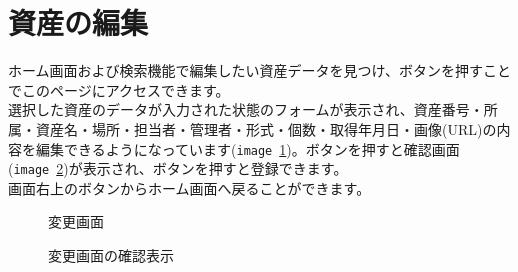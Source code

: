 \documentclass[11ptm]{jsarticle}
\begin{document}
\clearpage
\section{資産の編集}
\label{sec:資産の編集}
ホーム画面および検索機能で編集したい資産データを見つけ、ボタンを押すことでこのページにアクセスできます。\\
選択した資産のデータが入力された状態のフォームが表示され、資産番号・所属・資産名・場所・担当者・管理者・形式・個数・取得年月日・画像(URL)の内容を編集できるようになっています({\tt image}\ \ref{fig:変更画面})。ボタンを押すと確認画面({\tt image}\ \ref{fig:変更画面の確認表示})が表示され、ボタンを押すと登録できます。\\
画面右上のボタンからホーム画面へ戻ることができます。
\begin{figure}[h]
  \centering
  \caption{\label{fig:変更画面}変更画面}
\end{figure}
\begin{figure}[h]
  \centering
  \caption{\label{fig:変更画面の確認表示}変更画面の確認表示}
\end{figure}
\end{document}
